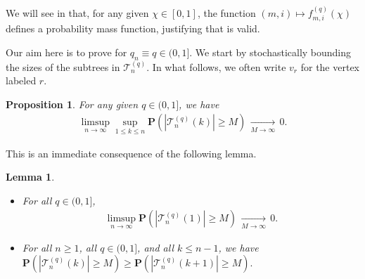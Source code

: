 \documentclass{article}
\newtheorem{lemma}[theorem]{Lemma}
\newtheorem{proposition}[theorem]{Proposition}
\theoremstyle{remark}
\newcommand{\cv}[1]{\,\underset{#1}{\longrightarrow}\,}
\newcommand{\cT}{\mathcal{T}}
\newcommand{\prob}[1]{\mathbf{P}{\left(#1\right)}}
\begin{document}
We will see in  that, for any given $\chi\in[0,1]$, the function $(m,i) \mapsto f_{m,i}^{(q)}(\chi)$ defines a probability mass function, justifying that  is valid.

Our aim here is to prove  for $q_n \equiv q \in (0,1]$.
We start by stochastically bounding the sizes of the subtrees in $\cT_n^{(q)}$.
In what follows, we often write $v_r$ for the vertex labeled $r$.

\begin{proposition}
\label{prop:stochastic bound for size subtree}
For any given $q\in(0,1]$, we have
\begin{align*}
    \limsup_{n \rightarrow \infty} \sup_{1 \leq k \leq n} \prob{|\cT_n^{(q)}(k)| \geq M} \cv{M\to\infty} 0. 
\end{align*}
\end{proposition}

This is an immediate consequence of the following lemma.

\begin{lemma}
    \begin{itemize}
    \item[(i)] For all $q \in (0,1]$,
        \begin{align*}
            \limsup_{n \rightarrow \infty} \prob{|\cT_n^{(q)}(1)| \geq M} \cv{M\to\infty} 0.
        \end{align*}
    \item[(ii)] For all $n \geq 1$, all $q \in (0,1]$, and all $k \leq n-1$, we have $\prob{|\cT_n^{(q)}(k)| \geq M} \geq \prob{|\cT_n^{(q)}(k+1)| \geq M} .$
    \end{itemize}
\end{lemma}
\end{document}
